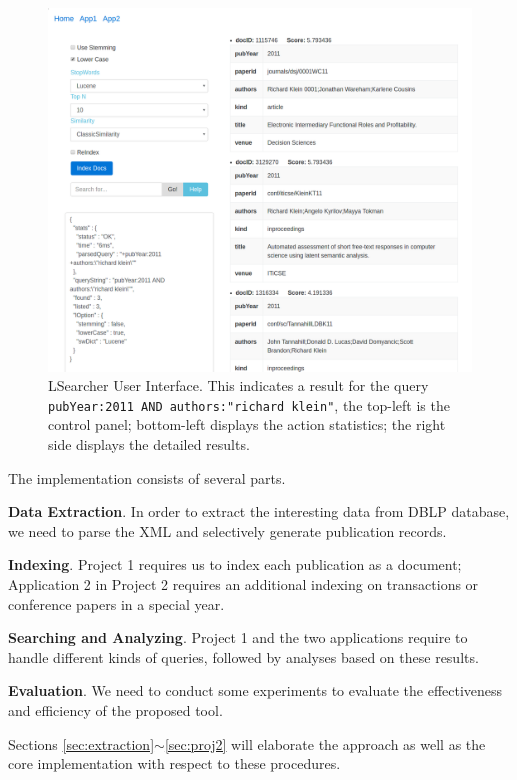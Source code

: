 \begin{figure}
  \centering
  \includegraphics[width=\columnwidth]{ui.png}
  \cprotect\caption{LSearcher User Interface. This indicates a result for the query \verb|pubYear:2011 AND authors:"richard klein"|, the top-left is the control panel; bottom-left displays the action statistics; the right side displays the detailed results.}\label{fig:ui}
\end{figure}

The implementation consists of several parts.

\textbf{Data Extraction}. In order to extract the interesting data from DBLP database, we need to parse the XML and selectively generate publication records.

\textbf{Indexing}. Project 1 requires us to index each publication as a document; Application 2 in Project 2 requires an additional indexing on transactions or conference papers in a special year.

\textbf{Searching and Analyzing}. Project 1 and the two applications require to handle different kinds of queries, followed by analyses based on these results.

\textbf{Evaluation}. We need to conduct some experiments to evaluate the effectiveness and efficiency of the proposed tool.

Sections \ref{sec:extraction}$\sim$\ref{sec:proj2} will elaborate the approach as well as the core implementation with respect to these procedures.

